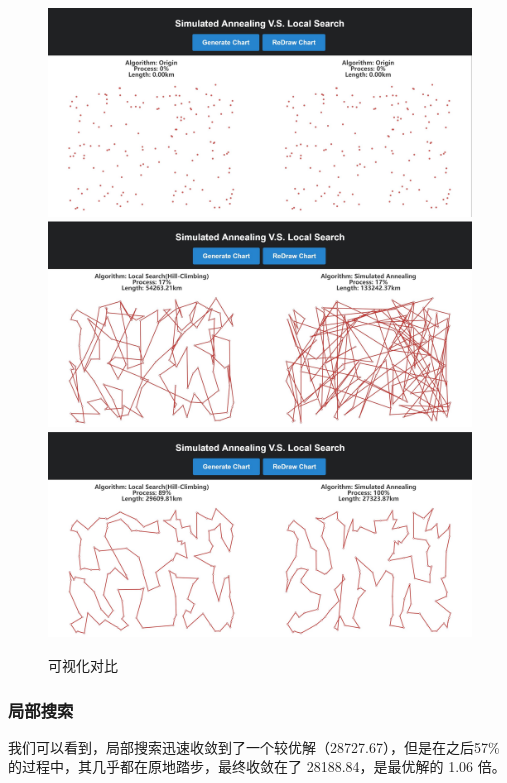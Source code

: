 \begin{figure}
\centering
\includegraphics[width=\textwidth]{origin.jpg}\\
\includegraphics[width=\textwidth]{processing.jpg}\\
\includegraphics[width=\textwidth]{final.jpg}
\caption{\label{fig:final}可视化对比}
\end{figure}

\subsubsection{局部搜索}

我们可以看到，局部搜索迅速收敛到了一个较优解（28727.67），但是在之后57\%的过程中，其几乎都在原地踏步，最终收敛在了 28188.84，是最优解的 1.06 倍。

